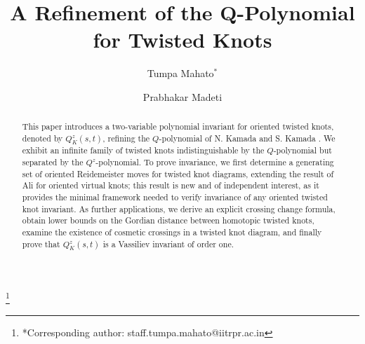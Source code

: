 \documentclass[10pt,a4paper,reqno]{amsart}
\theoremstyle{definition}
\theoremstyle{remark}
\begin{document}
	
	\title[A Refinement of the Q-Polynomial for Twisted Knots]{A Refinement of the Q-Polynomial for Twisted Knots}
	
	
	\author[T. MAHATO]{Tumpa Mahato$^*$}
	\address{Department of Mathematics,\\ Indian Institute of Technology, Ropar, Punjab 140001, India}
	\thanks{*Corresponding author: staff.tumpa.mahato@iitrpr.ac.in}
	
	\author[P. MADETI]{Prabhakar Madeti}
	\address{Department of Mathematics,\\ Indian Institute of Technology, Ropar, Punjab 140001, India}
	
	
	\makeatletter
	\makeatother
	
%	
	
	
	
	
	\begin{abstract}
This paper introduces a two-variable polynomial invariant for oriented twisted knots, denoted by $Q_{K}^{z}(s,t)$, refining the $Q$-polynomial of N. Kamada and S. Kamada \cite{NaoSei}. We exhibit an infinite family of twisted knots indistinguishable by the $Q$-polynomial but separated by the $Q^z$-polynomial. To prove invariance, we first determine a generating set of oriented Reidemeister moves for twisted knot diagrams, extending the result of Ali \cite{Dan} for oriented virtual knots; this result is new and of independent interest, as it provides the minimal framework needed to verify invariance of any oriented twisted knot invariant. As further applications, we derive an explicit crossing change 
formula, obtain lower bounds on the Gordian distance between homotopic twisted knots, examine the existence of cosmetic crossings in a twisted knot diagram, and finally prove that $Q^{z}_{K}(s,t)$ is a Vassiliev invariant of order one.
	\end{abstract}
	
	\maketitle
	
\end{document}
